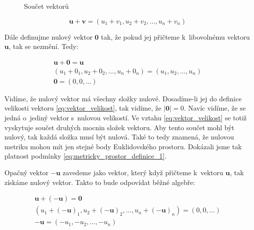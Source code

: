 \documentclass{book}
\newcommand{\vect}[1]{\boldsymbol{#1}}
\newcommand{\vectpoints}[1]{\overrightarrow{#1}}
\begin{document}
\begin{figure}[!h]
\centering
{}
\caption{Součet vektorů}
\label{img:soucet_vektoru}
\end{figure}

\begin{equation}
\label{eq:euklidovsky_prostor_vektor_soucet}
\vect{u} + \vect{v} = (u_1 + v_1, u_2 + v_2, ..., u_n + v_n)
\end{equation}

Dále definujme nulový vektor \(\vect{0}\) tak, že pokud jej přičteme k~libovolnému vektoru \(\vect{u}\), tak se nezmění. Tedy:

\begin{equation}
\begin{split}
\vect{u} + \vect{0} = \vect{u} \\
(u_1 + 0_1, u_2 + 0_2, ..., u_n + 0_n) = (u_1, u_2, ..., u_n ) \\
\vect{0} = (0, 0, ...)
\end{split}
\end{equation}

Vidíme, že nulový vektor má všechny složky nulové. Dosadíme-li jej do definice velikosti vektoru \eqref{eq:vektor_velikost}, tak vidíme, že \(|\vect{0}| = 0\). Navíc vidíme, že se jedná o~jediný vektor s~nulovou velikostí. Ve vztahu \eqref{eq:vektor_velikost} se totiž vyskytuje součet druhých mocnin složek vektoru. Aby tento součet mohl být nulový, tak každá složka musí být nulová. Také to tedy znamená, že nulovou metriku mohou mít jen stejné body Euklidovského prostoru. Dokázali jsme tak platnost podmínky \eqref{eq:metricky_prostor_definice_1}.

Opačný vektor \(-\vect{u}\) zavedeme jako vektor, který když přičteme k~vektoru \(\vect{u}\), tak získáme nulový vektor. Takto to bude odpovídat běžné algebře:

\begin{equation}
\begin{split}
\vect{u} + (-\vect{u}) = \vect{0} \\
(u_1 + (-\vect{u})_1, u_2 + (-\vect{u})_2, ..., u_n + (-\vect{u})_n) = (0, 0, ...) \\
-\vect{u} = (-u_1, -u_2, ..., -u_n)
\end{split}
\end{equation}
\end{document}
